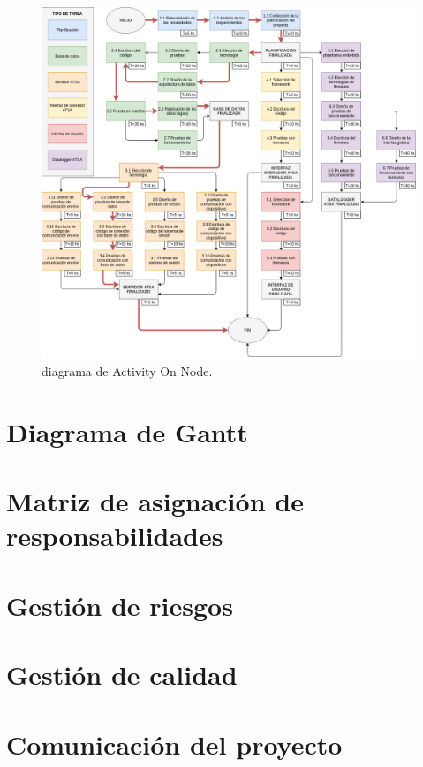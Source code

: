 \documentclass[
12pt,
spanish,
singlespacing,
parskip,
headsepline,]{article}
\begin{document}
\begin{figure}[H]
	\centering
	\includegraphics[width=\textwidth]{Figuras/ActivityOnNode.png}
	\caption{diagrama de Activity On Node.}
	\label{fig:activity}
\end{figure}

\section{Diagrama de Gantt}

\section{Matriz de asignación de responsabilidades}

\section{Gestión de riesgos}

\section{Gestión de calidad}

\section{Comunicación del proyecto}
\end{document}
